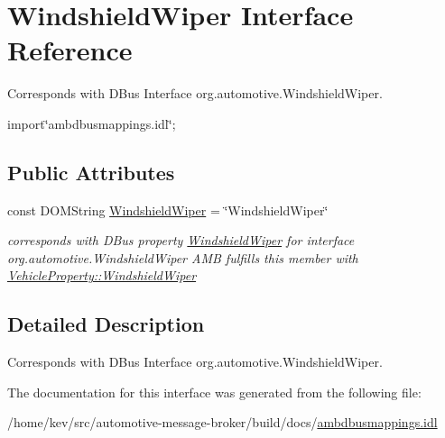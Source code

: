 \hypertarget{interfaceWindshieldWiper}{\section{Windshield\+Wiper Interface Reference}
\label{interfaceWindshieldWiper}
}


Corresponds with D\+Bus Interface org.\+automotive.\+Windshield\+Wiper.  




{\ttfamily import\char`\"{}ambdbusmappings.\+idl\char`\"{};}

\subsection*{Public Attributes}
\begin{DoxyCompactItemize}
\item 
\hypertarget{interfaceWindshieldWiper_acddede91624c4e376bc5d643dafef04c}{const D\+O\+M\+String \hyperlink{interfaceWindshieldWiper_acddede91624c4e376bc5d643dafef04c}{Windshield\+Wiper} = \char`\"{}Windshield\+Wiper\char`\"{}}\label{interfaceWindshieldWiper_acddede91624c4e376bc5d643dafef04c}

\begin{DoxyCompactList}\small\item\em corresponds with D\+Bus property \hyperlink{interfaceWindshieldWiper}{Windshield\+Wiper} for interface org.\+automotive.\+Windshield\+Wiper A\+M\+B fulfills this member with \hyperlink{classVehicleProperty_afe911cbe3c105b89c0f5b9f0163698c8}{Vehicle\+Property\+::\+Windshield\+Wiper} \end{DoxyCompactList}\end{DoxyCompactItemize}


\subsection{Detailed Description}
Corresponds with D\+Bus Interface org.\+automotive.\+Windshield\+Wiper. 

The documentation for this interface was generated from the following file\+:\begin{DoxyCompactItemize}
\item 
/home/kev/src/automotive-\/message-\/broker/build/docs/\hyperlink{ambdbusmappings_8idl}{ambdbusmappings.\+idl}\end{DoxyCompactItemize}
